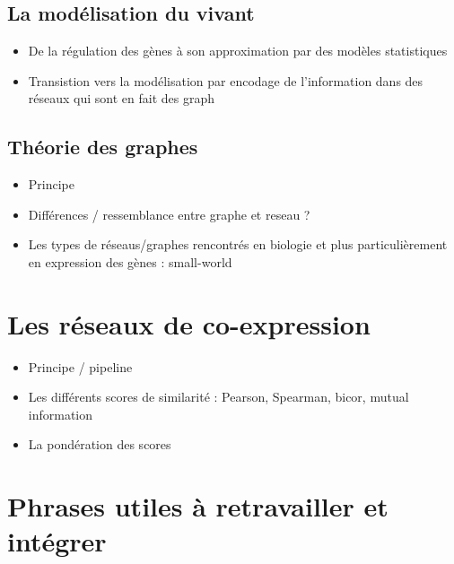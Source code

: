 \subsection{La modélisation du vivant}
\begin{itemize}
\item De la régulation des gènes à son approximation par des modèles statistiques
\item Transistion vers la modélisation par encodage de l'information dans des réseaux qui sont en fait des graph
\end{itemize}

\subsection{Théorie des graphes}
\begin{itemize}
\item Principe 
\item Différences / ressemblance entre graphe et reseau ?
\item Les types de réseaus/graphes rencontrés en biologie et plus particulièrement en expression des gènes : small-world
\end{itemize}

\section{Les réseaux de  co-expression}
\begin{itemize}
\item Principe / pipeline 
\item Les différents scores de similarité : Pearson, Spearman, bicor, mutual information
\item La pondération des scores 
\end{itemize}


\section*{Phrases utiles à retravailler et intégrer}

